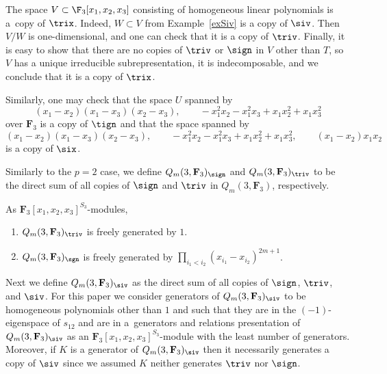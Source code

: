 \begin{Example}\label{deg1polys}
 The space $V\subset\F_3[x_1,x_2,x_3]$ consisting of homogeneous linear polynomials is a~copy of $\trix$. Indeed, $W\subset V$ from Example~\ref{exSiv} is a copy of $\siv$. Then~$V/W$ is one-dimensional, and one can check that it is a copy of $\triv$. Finally, it is easy to show that there are no copies of $\triv$ or $\sign$ in $V$ other than $T$, so $V$ has a unique irreducible subrepresentation, it is indecomposable, and we conclude that it is a copy of $\trix$.
\end{Example}

\begin{Example}
 Similarly, one may check that the space $U$ spanned by
 \[(x_1-x_2)(x_1-x_3)(x_2-x_3),\qquad-x_1^2x_2-x_1^2x_3+x_1x_2^2+x_1x_3^2\]
 over $\mathbf{F}_3$ is a copy of $\tign$ and that the space spanned by
 \[(x_1-x_2)(x_1-x_3)(x_2-x_3),\qquad-x_1^2x_2-x_1^2x_3+x_1x_2^2+x_1x_3^2,\qquad(x_1-x_2)x_1x_2\]
 is a copy of $\six$.
\end{Example}

Similarly to the $p=2$ case, we define $Q_m(3,\mathbf{F}_3)_{\sign}$ and $Q_m(3,\mathbf{F}_3)_{\triv}$ to be the direct sum of all copies of $\sign$ and $\triv$ in $Q_m(3,\mathbf{F}_3)$, respectively.
\begin{Proposition}\label{prop:trivsign}
 As $\mathbf{F}_3[x_1,x_2,x_3]^{S_3}$-modules,
 \begin{enumerate}\itemsep=0pt
 \item[$1$.] $Q_m(3,\mathbf{F}_3)_\triv$ is freely generated by $1$.
 \item[$2$.] $Q_m(3,\mathbf{F}_3)_\sgn$ is freely generated by $\prod_{i_1<i_2}(x_{i_1}-x_{i_2})^{2m+1}$.
 \end{enumerate}
\end{Proposition}

Next we define $Q_m(3,\mathbf{F}_3)_{\siv}$ as the direct sum of all copies of $\sign$, $\triv$, and $\siv$. For this paper we consider generators of $Q_m(3,\mathbf{F}_3)_{\siv}$ to be homogeneous polynomials other than $1$ and  such that they are in the $(-1)$-eigenspace of $s_{12}$ and are in a~generators and relations presentation of $Q_m(3,\mathbf{F}_3)_{\siv}$ as an $\mathbf{F}_3[x_1,x_2,x_3]^{S_3}$-module with the least number of generators. Moreover, if $K$ is a generator of $Q_m(3,\mathbf{F}_3)_{\siv}$ then it necessarily generates a copy of $\siv$ since we assumed $K$ neither generates $\triv$ nor $\sign$.

